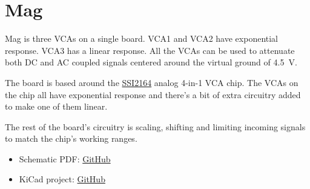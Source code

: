 \documentclass[a4paper,12pt]{article}
\begin{document}
\section{Mag}\label{sec:mag}

Mag is three VCAs on a single board. VCA1 and VCA2 have
exponential response. VCA3 has a linear response. All the
VCAs can be used to attenuate both DC and AC coupled signals
centered around the virtual ground of \SI{4.5}{V}.

The board is based around the
\href{https://www.soundsemiconductor.com/downloads/ssi2164datasheet.pdf}{SSI2164}
analog 4-in-1 VCA chip. The VCAs on the chip all have
exponential response and there's a bit of extra circuitry
added to make one of them linear.

The rest of the board's circuitry is scaling, shifting and
limiting incoming signals to match the chip's working
ranges.

\begin{itemize}
  \item Schematic PDF:
    \href{https://github.com/flpvsk/pedalmarkt-docs/tree/main/elements2-modulation-docs/include}{GitHub}

  \item KiCad project:
    \href{https://github.com/flpvsk/pt-workshop/tree/main/vca-board}{GitHub}
\end{itemize}

\pagebreak
\end{document}
